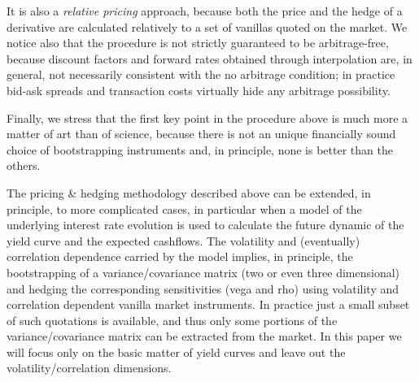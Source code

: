 \documentclass[11pt,reqno]{amsart}
\begin{document}
\par
It is also a \emph{relative pricing} approach, because both the price and the hedge of a derivative are calculated relatively to a set of vanillas quoted on the market. We notice also that the procedure is not strictly guaranteed to be arbitrage-free, because discount factors and forward rates obtained through interpolation are, in general, not necessarily consistent with the no arbitrage condition; in practice bid-ask spreads and transaction costs virtually hide any arbitrage possibility.
\par
Finally, we stress that the first key point in the procedure above is much more a matter of art than of science, because there is not an unique financially sound choice of bootstrapping instruments and, in principle, none is better than the others.
\par
The pricing \& hedging methodology described above can be extended, in principle, to more complicated cases, in particular when a model of the underlying interest rate evolution is used to calculate the future dynamic of the yield curve and the expected cashflows. The volatility and (eventually) correlation dependence carried by the model implies, in principle, the bootstrapping of a variance/covariance matrix (two or even three dimensional) and hedging the corresponding sensitivities (vega and rho) using volatility and correlation dependent vanilla market instruments. In practice just a small subset of such quotations is available, and thus only some portions of the variance/covariance matrix can be extracted from the market. In this paper we will focus only on the basic matter of yield curves and leave out the volatility/correlation dimensions.
\end{document}
